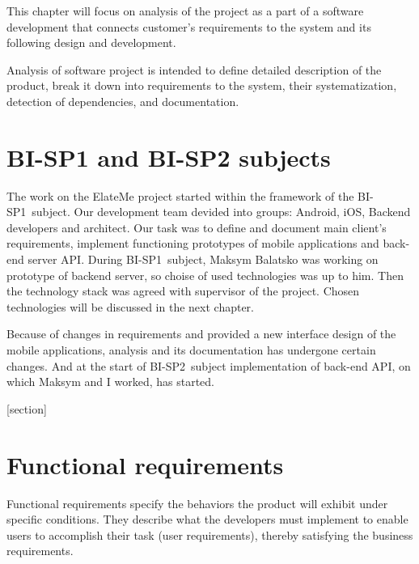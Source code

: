 This chapter will focus on analysis of the project as a part of a software development that connects customer's
requirements to the system and its following design and development.

Analysis of software project is intended to define detailed description of the product, break it down into
requirements to the system, their systematization, detection of dependencies, and documentation.


\section{BI-SP1 and BI-SP2 subjects}
The work on the ElateMe project started within the framework of the BI-SP1~subject. Our development team devided into
groups: Android, iOS, Backend developers and architect. Our task was to define and document main client's
requirements, implement functioning prototypes of mobile applications and back-end server \ac{API}. During
BI-SP1~subject, Maksym Balatsko was working on prototype of backend server, so choise of used technologies was up to
him. Then the technology stack was agreed with supervisor of the project. Chosen technologies will be discussed in
the next chapter.

Because of changes in requirements and provided a new interface design of the mobile applications, analysis and its
documentation has undergone certain changes. And at the start of BI-SP2~subject implementation of back-end API,
on which Maksym and I worked, has started.


[section]
\newcommand{\req}[2]{\setlength\itemsep{-0.1em}
\stepcounter{reqcounter}
\item[\textbf{#1\arabic{reqcounter}}] \textbf{#2}.}
\newcommand{\funcreq}[1]{\req{F}{#1}}
\newcommand{\nonfreq}[1]{\req{N}{#1}}

\section{Functional requirements}
Functional requirements specify the behaviors the product will exhibit under specific conditions. They describe what
the developers must implement to enable users to accomplish their task (user requirements), thereby satisfying the
business requirements. \cite{funcreq}

